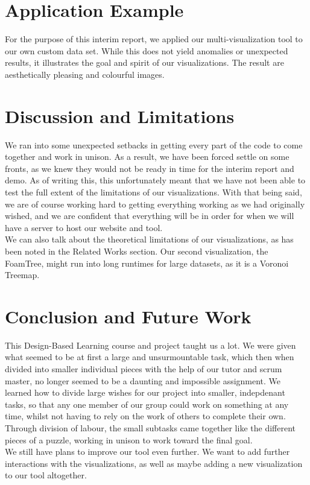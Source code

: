 \documentclass[journal, 9pt]{vgtc}                %
\begin{document}
\section{Application Example}


For the purpose of this interim report, we applied our multi-visualization tool to our own custom data set. While this does not yield anomalies or unexpected results,
it illustrates the goal and spirit of our visualizations. 
The result are aesthetically pleasing and colourful images.


\section{Discussion and Limitations}

We ran into some unexpected setbacks in getting every part of the code to come together and work in unison. As a result, we have been forced settle on some fronts,
as we knew they would not be ready in time for the interim report and demo. As of writing this, this unfortunately meant that we have not been able to test the full 
extent of the limitations of our visualizations. With that being said, we are of course working hard to getting everything working as we had originally wished, and we are
confident that everything will be in order for when we will have a server to host our website and tool.\\
We can also talk about the theoretical limitations of our visualizations, as has been noted in the Related Works section. Our second visualization, the FoamTree,
might run into long runtimes for large datasets, as it is a Voronoi Treemap.

\section{Conclusion and Future Work}

This Design-Based Learning course and project taught us a lot. We were given what seemed to be at first a large and unsurmountable task, which then when divided
into smaller individual pieces with the help of our tutor and scrum master, no longer seemed to be a daunting and impossible assignment. We learned how to divide
large wishes for our project into smaller, indepdenant tasks, so that any one member of our group could work on something at any time, whilst not having to rely on
the work of others to complete their own. Through division of labour, the small subtasks came together like the different pieces of a puzzle, working in unison to work
toward the final goal.\\
We still have plans to improve our tool even further. We want to add further interactions with the visualizations, as well as maybe adding a new visualization to our
tool altogether.
\end{document}
